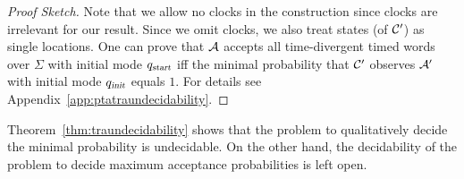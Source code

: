 \begin{proof}[Proof Sketch]
Note that we allow no clocks in the construction since clocks are irrelevant for our result.
Since we omit clocks, we also treat states (of $\mathcal{C}'$) as single locations.
One can prove that $\mathcal{A}$ accepts all time-divergent timed words over $\Sigma$ with initial mode $q_{\mbox{\sl\scriptsize start}}$ iff
the minimal probability that $\mathcal{C}'$ observes $\mathcal{A}'$ with initial mode $q_{\mbox{\sl\scriptsize init} }$ equals $1$.
For details see Appendix~\ref{app:ptatraundecidability}.
\end{proof}

\begin{remark}
Theorem~\ref{thm:traundecidability} shows that the problem to qualitatively decide the minimal probability is undecidable.
On the other hand, the decidability of the problem to decide maximum acceptance probabilities is left open.
\end{remark}
